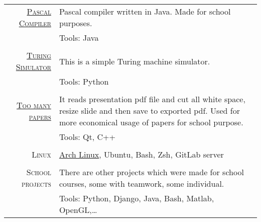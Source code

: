 \documentclass[a4paper,10pt]{article} %
\begin{document}
\begin{tabular}{rp{10cm}}
\href{https://github.com/majcn/pascalCompiler}{\textsc{Pascal Compiler}} & Pascal compiler written in Java. Made for school purposes. \\
& \footnotesize{Tools: Java} \\
\\

\href{https://github.com/majcn/TuringSimulator}{\textsc{Turing Simulator}} & This is a simple Turing machine simulator. \\
& \footnotesize{Tools: Python} \\
\\

\href{https://github.com/majcn/VarcneProsojnice}{\textsc{Too many papers}} & It reads presentation pdf file and cut all white space, resize slide and then save to exported pdf. Used for more economical usage of papers for school purpose. \\
& \footnotesize{Tools: Qt, C++} \\
\\

\textsc{Linux} & \href{https://github.com/majcn/MyArchLinux}{Arch Linux}, Ubuntu, Bash, Zsh, GitLab server \\
\\

\textsc{School projects} & There are other projects which were made for school courses, some with teamwork, some individual. \\
& \footnotesize{Tools: Python, Django, Java, Bash, Matlab, OpenGL,\dots} 

\end{tabular}
\end{document}
